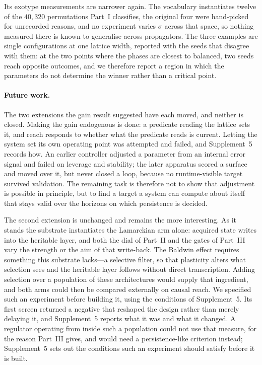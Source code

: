 \documentclass[man,12pt,floatsintext,donotrepeattitle]{apa7}
\newcommand{\sig}{\sigma}
\begin{document}
Its exotype measurements are narrower again. The vocabulary instantiates twelve of the
$40{,}320$ permutations Part~I classifies, the original four were hand-picked for
unrecorded reasons, and no experiment varies $\sig$ across that space, so nothing measured
there is known to generalise across propagators. The three examples are single
configurations at one lattice width, reported with the seeds that disagree with them: at
the two points where the phases are closest to balanced, two seeds reach opposite outcomes,
and we therefore report a region in which the parameters do not determine the winner rather
than a critical point.

\paragraph{Future work.} The two extensions the gain result suggested have each moved,
and neither is closed. Making the gain endogenous is done: a predicate reading the lattice
sets it, and reach responds to whether what the predicate reads is current. Letting the
system set its own operating point was attempted and failed, and Supplement~5 records how.
An earlier controller adjusted a parameter from an internal error signal and failed on
leverage and stability; the later apparatus scored a surface and moved over it, but never
closed a loop, because no runtime-visible target survived validation. The remaining task is
therefore not to show that adjustment is possible in principle, but to find a target a
system can compute about itself that stays valid over the horizons on which persistence is
decided.

The second extension is unchanged and remains the more interesting. As it stands the
substrate instantiates the Lamarckian arm alone: acquired state writes into the
heritable layer, and both the dial of Part~II and the gates of Part~III vary the
strength or the aim of that write-back. The Baldwin effect requires something this
substrate lacks---a selective filter, so that plasticity alters what selection sees and
the heritable layer follows without direct transcription. Adding selection over a
population of these architectures would supply that ingredient, and both arms could then
be compared externally on causal reach. We specified such an experiment before
building it, using the conditions of Supplement~5. Its first screen returned a negative
that reshaped the design rather than merely delaying it, and Supplement~5 reports what it
was and what it changed. A regulator operating from inside such a
population could not use that measure, for the reason Part~III gives, and would need a
persistence-like criterion instead; Supplement~5 sets out the conditions such an
experiment should satisfy before it is built.
\end{document}
